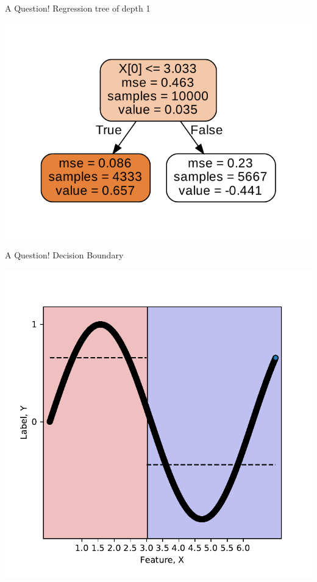 \documentclass{beamer}
\begin{document}
	\begin{frame}{A Question!}
	Regression tree of depth 1
	\begin{center}
	\includegraphics[scale=0.5]{sine-depth-1-decision-tree}
	\end{center}
	\end{frame}

	\begin{frame}{A Question!}
	Decision Boundary
	\begin{center}
	\includegraphics[scale=0.5]{sine-depth-1-tree}
	\end{center}
	\end{frame}
\end{document}
